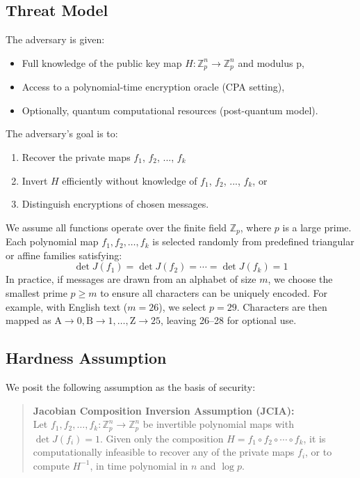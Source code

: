 \documentclass[12pt]{article}
\begin{document}
\subsection*{Threat Model}

The adversary is given:
\begin{itemize}
    \item Full knowledge of the public key map \( H: \mathbb{Z}_p^n \rightarrow \mathbb{Z}_p^n \) and modulus p,
    \item Access to a polynomial-time encryption oracle (CPA setting),
    \item Optionally, quantum computational resources (post-quantum model).
\end{itemize}

The adversary’s goal is to:
\begin{enumerate}
    \item Recover the private maps \( f_1 \), \( f_2 \), ..., \( f_k \)
    \item Invert \( H \) efficiently without knowledge of \( f_1 \), \( f_2 \), ..., \( f_k \), or
    \item Distinguish encryptions of chosen messages.
\end{enumerate}

We assume all functions operate over the finite field \( \mathbb{Z}_p \), where \( p \) is a large prime. Each polynomial map \( f_1, f_2, \ldots, f_k \) is selected randomly from predefined triangular or affine families satisfying:
\[
\det J(f_1) = \det J(f_2) = \cdots = \det J(f_k) = 1
\]
In practice, if messages are drawn from an alphabet of size \( m \), we choose the smallest prime \( p \geq m \) to ensure all characters can be uniquely encoded. For example, with English text (\( m = 26 \)), we select \( p = 29 \). Characters are then mapped as \( \text{A} \rightarrow 0, \text{B} \rightarrow 1, \ldots, \text{Z} \rightarrow 25 \), leaving 26–28 for optional use.


\subsection*{Hardness Assumption}

We posit the following assumption as the basis of security:

\begin{quote}
\textbf{Jacobian Composition Inversion Assumption (JCIA):} \\
Let \( f_1, f_2, \dots, f_k : \mathbb{Z}_p^n \to \mathbb{Z}_p^n \) be invertible polynomial maps with \( \det J(f_i) = 1 \). Given only the composition \( H = f_1 \circ f_2 \circ \cdots \circ f_k \), it is computationally infeasible to recover any of the private maps \( f_i \), or to compute \( H^{-1} \), in time polynomial in \( n \) and \( \log p \).
\end{quote}
\end{document}
